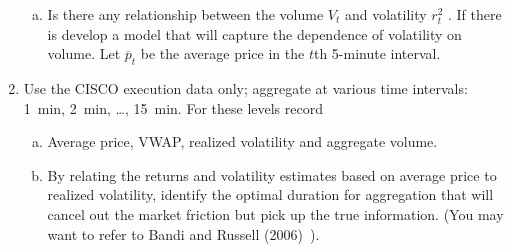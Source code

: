 \begin{enumerate}[1.]
\begin{enumerate}[(a)]
\item Is there any relationship between the volume $V_t$ and volatility $r_t^2$ . If there is develop a model that will capture the dependence of volatility on volume. Let $\overline{p}_t$ be the average price in the $t$th 5-minute
interval.
\end{enumerate}


\item Use the CISCO execution data only; aggregate at various time intervals: 1~min, 2~min, \dots, 15~min. For these levels record
\begin{enumerate}[(a)]
\item Average price, VWAP, realized volatility and aggregate volume.

\item By relating the returns and volatility estimates based on average price to realized volatility, identify the optimal duration for aggregation that will cancel out the market friction but pick up the true information. (You may want to refer to Bandi and Russell (2006)~\cite{bandi}). 
\end{enumerate}

\end{enumerate}